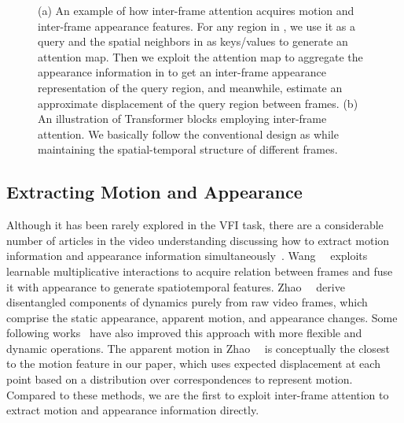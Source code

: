 \documentclass[10pt,twocolumn,letterpaper]{article}
\begin{document}
\begin{figure*}[t]
        \centering
        \quad \quad \quad \quad 
\caption{(a) An example of how inter-frame attention acquires motion and inter-frame appearance features. For any region in , we use it as a query and the spatial neighbors in  as keys/values to generate an attention map. Then we exploit the attention map to aggregate the appearance information in  to get an inter-frame appearance representation of the query region, and meanwhile, estimate an approximate displacement of the query region between frames. (b) An illustration of Transformer blocks employing inter-frame attention. We basically follow the conventional design as \cite{vaswani2017attention} while maintaining the spatial-temporal structure of different frames.}
        \label{fig:att}
        \vspace{-0.2in}
        \end{figure*}
\subsection{Extracting Motion and Appearance}
        Although it has been rarely explored in the VFI task, there are a considerable number of articles in the video understanding discussing how to extract motion information and appearance information simultaneously~\cite{diba2018spatio,wang2018appearance,zhao2018recognize,kwon2020motionsqueeze,wang2020video}. Wang~\etal~\cite{wang2018appearance} exploits learnable multiplicative interactions to acquire relation between frames and fuse it with appearance to generate spatiotemporal features. Zhao~\etal~\cite{zhao2018recognize} derive disentangled components of dynamics purely from raw video frames, which comprise the static appearance, apparent motion, and appearance changes. Some following works~\cite{wang2020video,kwon2020motionsqueeze} have also improved this approach with more flexible and dynamic operations. The apparent motion in Zhao~\etal~\cite{zhao2018recognize} is conceptually the closest to the motion feature in our paper, which uses expected displacement at each point based on a distribution over correspondences to represent motion. Compared to these methods, we are the first to exploit inter-frame attention to extract motion and appearance information directly.
\end{document}
